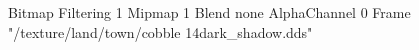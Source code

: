 {Bitmap
	{Filtering 1}
	{Mipmap 1}
	{Blend none}
	{AlphaChannel 0}
	{Frame "/texture/land/town/cobble 14dark_shadow.dds"}
}
